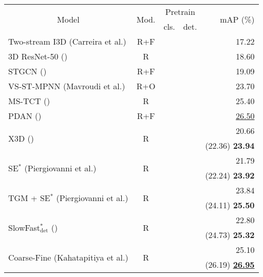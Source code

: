 \documentclass[letterpaper]{article} \usepackage{aaai23}  \usepackage{times}  \usepackage{helvet}  \usepackage{courier}  \usepackage[hyphens]{url}  \usepackage{graphicx} \urlstyle{rm} \def\UrlFont{\rm}  \usepackage{natbib}  \usepackage{caption} \frenchspacing  \setlength{\pdfpagewidth}{8.5in}  \setlength{\pdfpageheight}{11in}  \usepackage{algorithm}
\newcommand{\tablestyle}[2]{\setlength{\tabcolsep}{#1}\renewcommand{\arraystretch}{#2}\centering\footnotesize}
\begin{document}
\begin{table}[t!]
	\centering
	\tablestyle{1.8pt}{1.}
	\fontsize{9}{11}\selectfont
		\begin{tabular}{l|c|c|c|r}
			\multicolumn{1}{c|}{\multirow{2}{*}{Model}} & \multicolumn{1}{c|}{\multirow{2}{*}{Mod.}} & \multicolumn{2}{c|}{Pretrain}  & \multirow{2}{*}{$\;$mAP (\%)} \\
			{} & {} & cls. & det. & {} \\
			\shline
			{Two-stream I3D (Carreira et al.)} & {R+F} & \checkmark & {} & 17.22 \\
			3D ResNet-50 (\citeauthor{he2016deep}) & {R} & \checkmark & {} &   18.60 \\
			{STGCN (\citeauthor{ghosh2020stacked})} & {R+F} & \checkmark & {} & 19.09 \\
			{VS-ST-MPNN (Mavroudi et al.)} & {R+O} & \checkmark & {} & 23.70 \\
			{MS-TCT (\citeauthor{dai2022mstct})} & {R} & \checkmark & {} & 25.40 \\
			{PDAN (\citeauthor{dai2021pdan})} & {R+F} & \checkmark & {} & \underline{26.50} \\
			
			\hline
			\multirow{2}{*}{{X3D (\citeauthor{feichtenhofer2020x3d})}} & \multirow{2}{*}{R} & \checkmark & {} &   20.66 \\
			{} & {} & {} & \checkmark & (22.36) {\textbf{23.94}} \\
			\hline
			\multirow{2}{*}{{SE$^*$ (Piergiovanni et al.)}} & \multirow{2}{*}{R} & \checkmark & {} & {21.79}  \\
			{} & {} & {} & \checkmark & (22.24) {\textbf{23.92}} \\
			\hline
			\multirow{2}{*}{{TGM + SE$^*$ (Piergiovanni et al.)}} & \multirow{2}{*}{R} & \checkmark & {} & {23.84}  \\
			{} & {} & {} & \checkmark & (24.11) {\textbf{25.50}} \\
			\hline
			\multirow{2}{*}{SlowFast$_{\text{det}}^*$ (\citeauthor{feichtenhofer2019slowfast})} & \multirow{2}{*}{R} & \checkmark & {} & 22.80  \\
			{} & {} & {} & \checkmark & (24.73) {\textbf{25.32}} \\
			\hline
			\multirow{2}{*}{{Coarse-Fine (Kahatapitiya et al.)}} & \multirow{2}{*}{R} & \checkmark & {} & 25.10 \\
			{} & {} & {} & \checkmark & (26.19) {\underline{\textbf{26.95}}} \\
			


\end{tabular}
\end{table}
\end{document}
